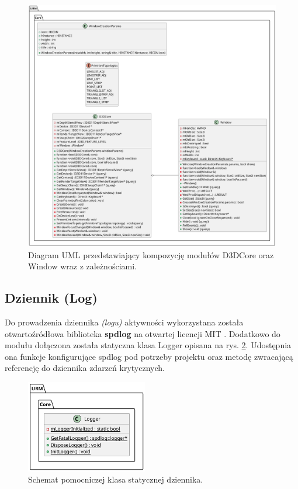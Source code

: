 	
	\begin{figure}[ht!]
		\centering
		\includegraphics[width=\textwidth]{images/UML/core.png}
		\caption{Diagram UML przedstawiający kompozycję modułów D3DCore oraz Window wraz z zależnościami.}
		\label{UML_D3DCore}
	\end{figure}
	
	\vfill
	\clearpage
	
\subsection{Dziennik (Log)}
	Do prowadzenia dziennika \textit{(logu)} aktywności wykorzystana została otwartoźródłowa biblioteka \textbf{spdlog} na otwartej licencji MIT \cite{github:spdlog:spdlog}. Dodatkowo do modułu dołączona została statyczna klasa Logger opisana na rys. \ref{UML_Logger}. Udostępnia ona funkcje konfigurujące spdlog pod potrzeby projektu oraz metodę zwracającą referencję do dziennika zdarzeń krytycznych.
	

	\begin{figure}[h!]
		\centering
		\includegraphics[width=200px]{images/UML/logging.png}
		\caption{Schemat pomocniczej klasa statycznej dziennika.}
		\label{UML_Logger}
	\end{figure}
	
